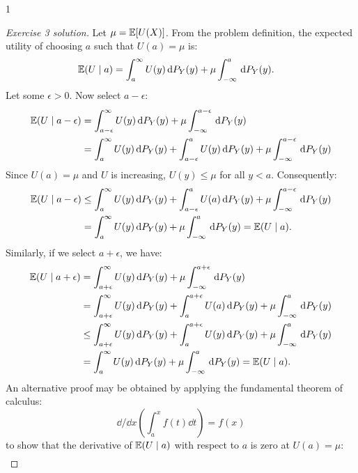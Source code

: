 \documentclass[twoside,a4paper]{article}
\def \solution {0}
\begin{document}
\if\solution 1
\begin{proof}[Exercise 3 solution]
  Let $\mu = \mathop{\mbox{\ensuremath{\mathbb{E}}}}\nolimits[U(X)]$.  From the problem definition, the expected
  utility of choosing $a$ such that $U(a) = \mu$ is:
  \begin{align*}
    \mathop{\mbox{\ensuremath{\mathbb{E}}}}\nolimits(U \mid a)
    & = 
    \int_a^\infty U(y) \, \mathrm{d}{P_Y}(y) 
    + 
    \mu \int_{-\infty}^a \, \mathrm{d}{P_Y}(y).
  \end{align*}
  Let some $\epsilon >
  0$. Now select $a - \epsilon$:
  \begin{align*}
    \mathop{\mbox{\ensuremath{\mathbb{E}}}}\nolimits(U \mid a - \epsilon)
    & = 
    \int_{a - \epsilon}^\infty U(y) \, \mathrm{d}{P_Y}(y) 
    +
    \mu \int_{-\infty}^{a-\epsilon} \, \mathrm{d}{P_Y}(y)
    \\
    & = 
    \int_a^\infty U(y) \, \mathrm{d}{P_Y}(y) 
    + 
    \int_{a-\epsilon}^a U(y) \, \mathrm{d}{P_Y}(y) 
    +
    \mu \int_{-\infty}^{a-\epsilon} \, \mathrm{d}{P_Y}(y)
  \end{align*}
  Since $U(a) = \mu$ and $U$ is increasing, $U(y) \leq
  \mu$ for all $y < a$. Consequently:
  \begin{align*}
    \mathop{\mbox{\ensuremath{\mathbb{E}}}}\nolimits(U \mid a - \epsilon)
    & \leq
    \int_a^\infty U(y) \, \mathrm{d}{P_Y}(y) 
    + 
    \int_{a-\epsilon}^a U(a) \, \mathrm{d}{P_Y}(y) 
    +
    \mu \int_{-\infty}^{a - \epsilon} \, \mathrm{d}{P_Y}(y)
    \\
    & =
    \int_a^\infty U(y) \, \mathrm{d}{P_Y}(y) 
    +
    \mu \int_{-\infty}^a \, \mathrm{d}{P_Y}(y)
    =
    \mathop{\mbox{\ensuremath{\mathbb{E}}}}\nolimits(U \mid a).
  \end{align*}
  Similarly, if we select $a + \epsilon$, we have:
  \begin{align*}
    \mathop{\mbox{\ensuremath{\mathbb{E}}}}\nolimits(U \mid a + \epsilon)
    & = 
    \int_{a+\epsilon} ^\infty U(y) \, \mathrm{d}{P_Y}(y) 
    +
    \mu \int_{-\infty}^{a + \epsilon} \, \mathrm{d}{P_Y}(y)
    \\
    & = 
    \int_{a+\epsilon} ^\infty U(y) \, \mathrm{d}{P_Y}(y) 
    +
    \int_{a}^{a + \epsilon} U(a) \, \mathrm{d}{P_Y}(y) 
    +
    \mu \int_{-\infty}^{a} \, \mathrm{d}{P_Y}(y)
    \\
    &\leq
    \int_{a+\epsilon} ^\infty U(y) \, \mathrm{d}{P_Y}(y) 
    +
    \int_{a}^{a + \epsilon} U(y) \, \mathrm{d}{P_Y}(y) 
    +
    \mu \int_{-\infty}^{a} \, \mathrm{d}{P_Y}(y)
    \\
    &=
    \int_{a} ^\infty U(y) \, \mathrm{d}{P_Y}(y) 
    +
    \mu \int_{-\infty}^{a} \, \mathrm{d}{P_Y}(y)
    = 
    \mathop{\mbox{\ensuremath{\mathbb{E}}}}\nolimits(U \mid a).
  \end{align*}
  An alternative proof may be obtained by applying the fundamental theorem of calculus:
  \[
  \dd/\dd x \left(\int_a^x f(t)\dd{t} \right)  = f(x)
  \]
  to show that the derivative of $\mathop{\mbox{\ensuremath{\mathbb{E}}}}\nolimits(U \mid a)$ with respect to $a$ is zero at $U(a) = \mu$:
  \begin{align*}

\end{align*}
\end{proof}
\end{document}
